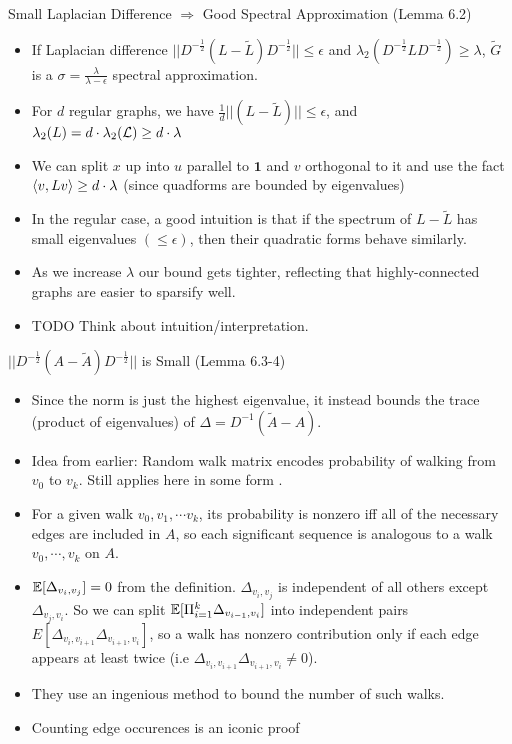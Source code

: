 \documentclass[presentation]{beamer}
\begin{document}
\begin{frame}[label={sec:org320e408}]{Small Laplacian Difference \(\Rightarrow\) Good Spectral Approximation (Lemma 6.2)}
\begin{itemize}
\item If Laplacian difference \(||D^{-\frac12}(L-\tilde{L}) D^{-\frac12}|| \le \epsilon\) and \(\lambda_2(D^{-\frac12}L D^{-\frac12}) \ge \lambda\), \(\tilde{G}\) is a \(\sigma = \frac{\lambda}{\lambda-\epsilon}\) spectral approximation.
\item For \(d\) regular graphs, we have \(\frac{1}{d}||(L-\tilde{L})|| \le \epsilon\), and \(\lambda_2(L)=d \cdot \lambda_2(\mathcal{L}) \ge d \cdot \lambda\)
\item We can split \(x\) up into \(u\) parallel to \(\textbf{1}\) and \(v\) orthogonal to it and use the fact \(\langle v , Lv \rangle \ge d \cdot \lambda\) (since quadforms are bounded by eigenvalues)
\item In the regular case, a good intuition is that if the spectrum of \(L-\tilde{L}\) has small eigenvalues \((\le \epsilon)\), then their quadratic forms behave similarly.
\item As we increase \(\lambda\) our bound gets tighter, reflecting that highly-connected graphs are easier to sparsify well.
\item TODO Think about intuition/interpretation.
\end{itemize}
\end{frame}
\begin{frame}[label={sec:org0e8dee4}]{\(||D^{-\frac12}(A-\tilde{A}) D^{-\frac12}||\) is Small (Lemma 6.3-4)}
\begin{itemize}
\item Since the norm is just the highest eigenvalue, it instead bounds the trace (product of eigenvalues) of \(\Delta= D^{-1}(\tilde{A}-A)\).
\item Idea from earlier: Random walk matrix encodes probability of walking from \(v_0\) to \(v_k\). Still applies here in some form .
\item For a given walk \(v_0,v_1,\cdots v_k\), its probability is nonzero iff all of the necessary edges are included in \(A\), so each significant sequence is analogous to a walk \(v_0, \cdots, v_k\) on \(A\).
\item \(\mathbb{E}[\Delta_{v_i,v_j}]=0\) from the definition. \(\Delta_{v_i,v_j}\) is independent of all others except \(\Delta_{v_j,v_i}\). So we can split \(\mathbb{E}[\Pi_{i=1}^k \Delta_{v_{i-1},v_i}]\) into independent pairs \(E[\Delta_{v_i,v_{i+1}}\Delta_{v_{i+1},v_i}]\), so a walk has nonzero contribution only if each edge appears at least twice (i.e \(\Delta_{v_i,v_{i+1}}\Delta_{v_{i+1},v_i} \ne 0\)).
\item They use an ingenious method to bound the number of such walks.
\item Counting edge occurences is an iconic proof
\end{itemize}
\end{frame}
\end{document}
